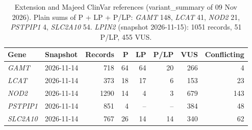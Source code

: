 \documentclass{article} %
\begin{document}
\begin{table}[h]
\caption{Extension and Majeed ClinVar references (variant\_summary of 09 Nov 2026). Plain sums of P + LP + P/LP: \emph{GAMT} 148, \emph{LCAT} 41, \emph{NOD2} 21, \emph{PSTPIP1} 4, \emph{SLC2A10} 54. \emph{LPIN2} (snapshot 2026-11-15): 1051 records, 51 P/LP, 455 VUS.}
\begin{center}
\scriptsize
\begin{tabular}{llrrrrrr}
\toprule
Gene & Snapshot & Records & P & LP & P/LP & VUS & Conflicting \\
\midrule
\emph{GAMT} & 2026-11-14 & 718 & 64 & 64 & 20 & 266 & 4 \\
\emph{LCAT} & 2026-11-14 & 373 & 18 & 17 & 6 & 153 & 23 \\
\emph{NOD2} & 2026-11-14 & 1290 & 14 & 4 & 3 & 679 & 143 \\
\emph{PSTPIP1} & 2026-11-14 & 851 & 4 & -- & -- & 384 & 48 \\
\emph{SLC2A10} & 2026-11-14 & 767 & 26 & 14 & 14 & 340 & 62 \\
\bottomrule
\end{tabular}
\end{center}
\end{table}

\begin{table}[h]
\caption{Corpus of the registered six. ``Free elsewhere'' is a Europe PMC listing of a free copy outside PMC, not fetched (an upper bound). 421 of 1,496 corpus papers (28\%) have open full text, from 3,553 records screened.}
\begin{center}
\scriptsize
{}
\end{center}
\end{table}
\end{document}
